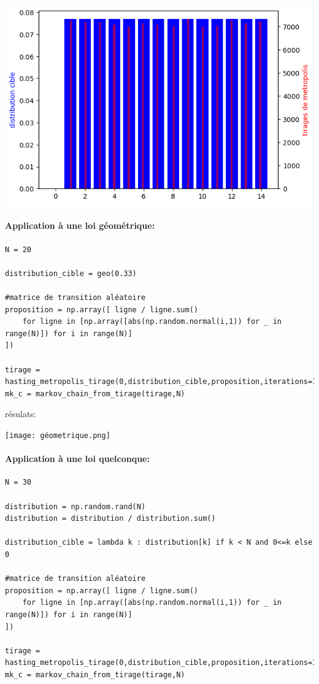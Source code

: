\documentclass{article}
\begin{document}
\includegraphics[scale=0.5]{uniforme.png}

\newpage
\paragraph{Application à une loi géométrique:}

\begin{verbatim}
N = 20

distribution_cible = geo(0.33)

#matrice de transition aléatoire
proposition = np.array([ ligne / ligne.sum()
    for ligne in [np.array([abs(np.random.normal(i,1)) for _ in range(N)]) for i in range(N)]
])

tirage = hasting_metropolis_tirage(0,distribution_cible,proposition,iterations=100_000)
mk_c = markov_chain_from_tirage(tirage,N)
\end{verbatim}

résulats:

\texttt{[image: géometrique.png]}

\newpage
\paragraph{Application à une loi quelconque:}

\begin{verbatim}
N = 30

distribution = np.random.rand(N)
distribution = distribution / distribution.sum()

distribution_cible = lambda k : distribution[k] if k < N and 0<=k else 0

#matrice de transition aléatoire
proposition = np.array([ ligne / ligne.sum()
    for ligne in [np.array([abs(np.random.normal(i,1)) for _ in range(N)]) for i in range(N)]
])

tirage = hasting_metropolis_tirage(0,distribution_cible,proposition,iterations=100_000)
mk_c = markov_chain_from_tirage(tirage,N)
\end{verbatim}
\end{document}

